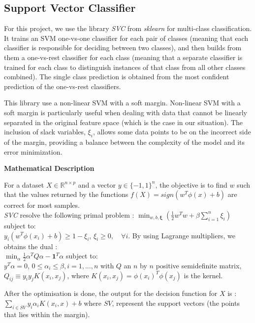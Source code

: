 \documentclass[twocolumn]{article}
\newcommand{\R}{\mathbb{R}}
\begin{document}
\subsection{Support Vector Classifier}
\label{4.3}
For this project, we use the library \textit{SVC} from \textit{sklearn} for multi-class classification. It trains an SVM one-vs-one classifier for each pair of classes (meaning that each classifier is responsible for deciding between two classes), and then builds from them a one-vs-rest classifier for each class (meaning that a separate classifier is trained for each class to distinguish instances of that class from all other classes combined). The single class prediction is obtained from the most confident prediction of the one-vs-rest classifiers.  

This library use a non-linear SVM with a soft margin. Non-linear SVM with a soft margin is particularly useful when dealing with data that cannot be linearly separated in the original feature space (which is the case in our situation). The inclusion of slack variables, \(\xi_i\), allows some data points to be on the incorrect side of the margin, providing a balance between the complexity of the model and its error minimization.

\textbf{\large Mathematical Description}

For a dataset $X \in \R^{n \times p}$ and a vector $y \in \{-1, 1\}^n$, the objective is to find $w$ such that the values returned by the functions $f(X) = sign(w^T\phi(x) + b)$ are correct for most samples.\\
\textit{SVC} resolve the following primal problem : \(\displaystyle
\min_{w, b, \boldsymbol{\xi}} \left( \frac{1}{2} w^T w + \beta \sum_{i=1}^{n} \xi_i \right)
\) 
subject to:\\
\( y_i (w^T \phi(x_i) + b) \geq 1 - \xi_i\), \(\xi_i \geq 0, \quad \forall i\).
By using Lagrange multipliers, we obtains the dual :\\
\(\displaystyle \min_{\alpha} \frac{1}{2} \alpha^T Q \alpha - \mathbf{1}^T \alpha
\) subject to:\\
\(y^T \alpha = 0\), \(0 \leq \alpha_i \leq \beta, i=1,...,n\) with $Q$ an $n$ by $n$ positive semidefinite matrix, $Q_{ij} \equiv y_iy_jK(x_i, x_j)$, where $K(x_i, x_j) = \phi(x_i)^T\phi(x_j)$ is the kernel. 

After the optimisation is done, the output for the decision function for $X$ is :\(\displaystyle \sum_{i\in SV} y_i\alpha_i K(x_i, x) + b\)
where $SV$, represent the support vectors (the points that lies within the margin).
\end{document}
